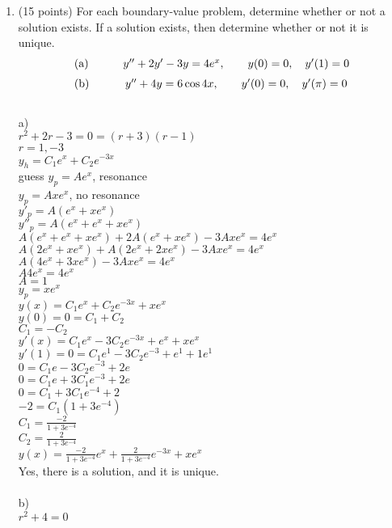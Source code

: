 \documentclass{article}
\begin{document}
\begin{enumerate}

\item (15 points)  For each boundary-value problem, determine whether or not a solution exists.  If a solution exists, then determine whether or not it is unique.
\[
\begin{array}{lc}
\hbox{(a)}\qquad & y\sp{\prime\prime}+2y\sp\prime-3y=4e\sp{x},\qquad y(0)=0,\quad y\sp\prime(1)=0 \medskip\\
\hbox{(b)}\qquad & y\sp{\prime\prime}+4y=6\cos4x,\qquad y\sp\prime(0)=0,\quad y\sp\prime(\pi)=0
\end{array}
\]
\\a)
\\$r^2+2r-3=0=(r+3)(r-1)$
\\$r=1,-3$
\\$y_h=C_1e^x+C_2e^{-3x}$
\\guess $y_p=Ae^x$, resonance
\\$y_p=Axe^x$, no resonance
\\$y'_p=A(e^x+xe^x)$
\\$y''_p=A(e^x+e^x+xe^x)$
\\$A(e^x+e^x+xe^x)+2A(e^x+xe^x)-3Axe^x=4e^x$
\\$A(2e^x+xe^x)+A(2e^x+2xe^x)-3Axe^x=4e^x$
\\$A(4e^x+3xe^x)-3Axe^x=4e^x$
\\$A4e^x=4e^x$
\\$A=1$
\\$y_p=xe^x$
\\$y(x)=C_1e^x+C_2e^{-3x}+xe^x$
\\$y(0)=0=C_1+C_2$
\\$C_1=-C_2$
\\$y'(x)=C_1e^x-3C_2e^{-3x}+e^x+xe^x$
\\$y'(1)=0=C_1e^1-3C_2e^{-3}+e^1+1e^1$
\\$0=C_1e-3C_2e^{-3}+2e$
\\$0=C_1e+3C_1e^{-3}+2e$
\\$0=C_1+3C_1e^{-4}+2$
\\$-2=C_1(1+3e^{-4})$
\\$C_1=\frac{-2}{1+3e^{-4}}$
\\$C_2=\frac{2}{1+3e^{-4}}$
\\$y(x)=\frac{-2}{1+3e^{-4}}e^x+\frac{2}{1+3e^{-4}}e^{-3x}+xe^x$
\\Yes, there is a solution, and it is unique.
\\
\\b)
\\$r^2+4=0$

\end{enumerate}
\end{document}
